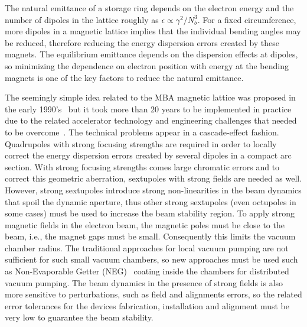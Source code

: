 The natural emittance of a storage ring depends on the electron energy and the number of dipoles in the lattice roughly as $\epsilon \propto \gamma^2/N_{b}^3$. For a fixed circumference, more dipoles in a magnetic lattice implies that the individual bending angles may be reduced, therefore reducing the energy dispersion errors created by these magnets. The equilibrium emittance depends on the dispersion effects at dipoles, so minimizing the dependence on electron position with energy at the bending magnets is one of the key factors to reduce the natural emittance.

The seemingly simple idea related to the MBA magnetic lattice was proposed in the early 1990's~\cite{einfeld1993} but it took more than 20 years to be implemented in practice due to the related accelerator technology and engineering challenges that needed to be overcome~\cite{hettel}. The technical problems appear in a cascade-effect fashion. Quadrupoles with strong focusing strengths are required in order to locally correct the energy dispersion errors created by several dipoles in a compact arc section. With strong focusing strengths comes large chromatic errors and to correct this geometric aberration, sextupoles with strong fields are needed as well. However, strong sextupoles introduce strong non-linearities in the beam dynamics that spoil the dynamic aperture, thus other strong sextupoles (even octupoles in some cases) must be used to increase the beam stability region. To apply strong magnetic fields in the electron beam, the magnetic poles must be close to the beam, i.e., the magnet gaps must be small. Consequently this limits the vacuum chamber radius. The traditional approaches for local vacuum pumping are not sufficient for such small vacuum chambers, so new approaches must be used such as Non-Evaporable Getter (NEG)~\cite{benvenuti} coating inside the chambers for distributed vacuum pumping. The beam dynamics in the presence of strong fields is also more sensitive to perturbations, such as field and alignments errors, so the related error tolerances for the devices fabrication, installation and alignment must be very low to guarantee the beam stability. 

